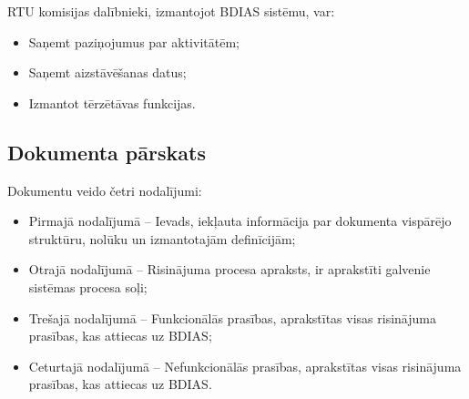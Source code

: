 RTU komisijas dalībnieki, izmantojot BDIAS sistēmu, var:

\begin{itemize}[noitemsep, nolistsep]
    \item Saņemt paziņojumus par aktivitātēm;
    \item Saņemt aizstāvēšanas datus;
    \item Izmantot tērzētāvas funkcijas.
\end{itemize}

\subsection{Dokumenta pārskats}

Dokumentu veido četri nodalījumi:

\begin{itemize}[noitemsep, nolistsep]
    \item Pirmajā nodalījumā – Ievads, iekļauta informācija par dokumenta vispārējo struktūru, nolūku un izmantotajām definīcijām;
    \item Otrajā nodalījumā – Risinājuma procesa apraksts, ir aprakstīti galvenie sistēmas procesa soļi;
    \item Trešajā nodalījumā – Funkcionālās prasības, aprakstītas visas risinājuma prasības, kas attiecas uz BDIAS;
    \item Ceturtajā nodalījumā – Nefunkcionālās prasības, aprakstītas visas risinājuma prasības, kas attiecas uz BDIAS.
\end{itemize}

\newpage